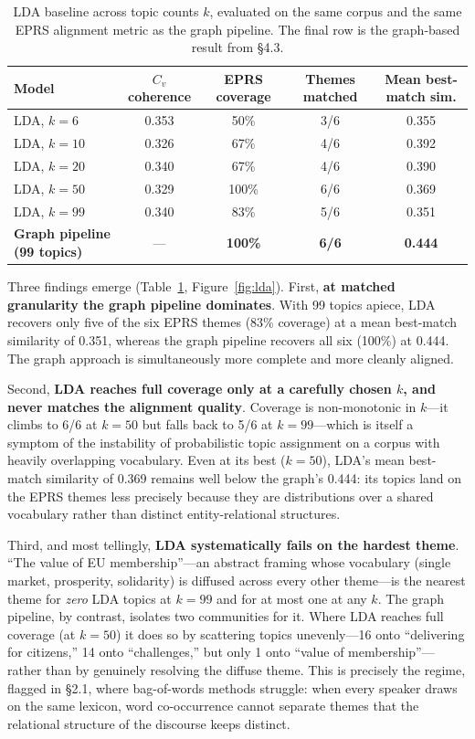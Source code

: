 \documentclass[11pt]{article}
\begin{document}
\begin{table}[h]
\centering
\small
\caption{LDA baseline across topic counts $k$, evaluated on the same corpus and the same EPRS alignment metric as the graph pipeline. The final row is the graph-based result from \S4.3.}
\label{tab:lda}
\begin{tabular}{lcccc}
\toprule
\textbf{Model} & \textbf{$C_v$ coherence} & \textbf{EPRS coverage} & \textbf{Themes matched} & \textbf{Mean best-match sim.} \\
\midrule
LDA, $k=6$   & 0.353 & 50\%  & 3/6 & 0.355 \\
LDA, $k=10$  & 0.326 & 67\%  & 4/6 & 0.392 \\
LDA, $k=20$  & 0.340 & 67\%  & 4/6 & 0.390 \\
LDA, $k=50$  & 0.329 & 100\% & 6/6 & 0.369 \\
LDA, $k=99$  & 0.340 & 83\%  & 5/6 & 0.351 \\
\midrule
\textbf{Graph pipeline (99 topics)} & --- & \textbf{100\%} & \textbf{6/6} & \textbf{0.444} \\
\bottomrule
\end{tabular}
\end{table}

Three findings emerge (Table~\ref{tab:lda}, Figure~\ref{fig:lda}). First, \textbf{at matched granularity the graph pipeline dominates}. With 99 topics apiece, LDA recovers only five of the six EPRS themes (83\% coverage) at a mean best-match similarity of 0.351, whereas the graph pipeline recovers all six (100\%) at 0.444. The graph approach is simultaneously more complete and more cleanly aligned.

Second, \textbf{LDA reaches full coverage only at a carefully chosen $k$, and never matches the alignment quality}. Coverage is non-monotonic in $k$---it climbs to 6/6 at $k=50$ but falls back to 5/6 at $k=99$---which is itself a symptom of the instability of probabilistic topic assignment on a corpus with heavily overlapping vocabulary. Even at its best ($k=50$), LDA's mean best-match similarity of 0.369 remains well below the graph's 0.444: its topics land on the EPRS themes less precisely because they are distributions over a shared vocabulary rather than distinct entity-relational structures.

Third, and most tellingly, \textbf{LDA systematically fails on the hardest theme}. ``The value of EU membership''---an abstract framing whose vocabulary (single market, prosperity, solidarity) is diffused across every other theme---is the nearest theme for \emph{zero} LDA topics at $k=99$ and for at most one at any $k$. The graph pipeline, by contrast, isolates two communities for it. Where LDA reaches full coverage (at $k=50$) it does so by scattering topics unevenly---16 onto ``delivering for citizens,'' 14 onto ``challenges,'' but only 1 onto ``value of membership''---rather than by genuinely resolving the diffuse theme. This is precisely the regime, flagged in \S2.1, where bag-of-words methods struggle: when every speaker draws on the same lexicon, word co-occurrence cannot separate themes that the relational structure of the discourse keeps distinct.
\end{document}
